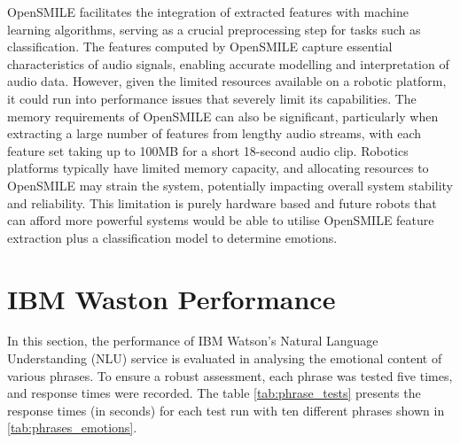 OpenSMILE facilitates the integration of extracted features with machine learning algorithms, serving as a crucial preprocessing step for tasks such as classification. The features computed by OpenSMILE capture essential characteristics of audio signals, enabling accurate modelling and interpretation of audio data. However, given the limited resources available on a robotic platform, it could run into performance issues that severely limit its capabilities. The memory requirements of OpenSMILE can also be significant, particularly when extracting a large number of features from lengthy audio streams, with each feature set taking up to 100MB for a short 18-second audio clip. Robotics platforms typically have limited memory capacity, and allocating resources to OpenSMILE may strain the system, potentially impacting overall system stability and reliability. This limitation is purely hardware based and future robots that can afford more powerful systems would be able to utilise OpenSMILE feature extraction plus a classification model to determine emotions.

\section{IBM Waston Performance}

In this section, the performance of IBM Watson's Natural Language Understanding (NLU) service is evaluated in analysing the emotional content of various phrases. To ensure a robust assessment, each phrase was tested five times, and response times were recorded. The table \ref{tab:phrase_tests} presents the response times (in seconds) for each test run with ten different phrases shown in \ref{tab:phrases_emotions}.

